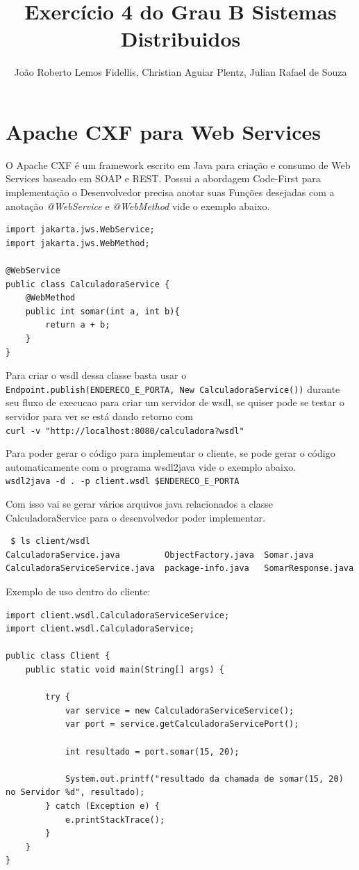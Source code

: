 \documentclass[12pt]{article}
\title{Exercício 4 do Grau B Sistemas Distribuidos}
\author{João Roberto Lemos Fidellis\inst{1}, Christian Aguiar Plentz\inst{2}, 
Julian Rafael de Souza\inst{3}}
\begin{document}
 

\maketitle

\section{Apache CXF para Web Services}

O Apache CXF é um framework escrito em Java para criação e consumo de Web Services baseado em SOAP e REST. Possui a abordagem Code-First para implementação o Desenvolvedor precisa anotar suas Funções desejadas com a anotação \textit{@WebService} e \textit{@WebMethod} vide o exemplo abaixo.

\begin{verbatim}
import jakarta.jws.WebService;
import jakarta.jws.WebMethod;

@WebService
public class CalculadoraService {
	@WebMethod
	public int somar(int a, int b){
		return a + b;
	}
}
\end{verbatim}

Para criar o wsdl dessa classe basta usar o  \\ 
\texttt{Endpoint.publish(ENDERECO\_E\_PORTA, New CalculadoraService())} 
durante seu fluxo de execucao para criar um servidor de wsdl, 
se quiser pode se testar o servidor para ver se está dando retorno com \\
\texttt{curl -v "http://localhost:8080/calculadora?wsdl"}

Para poder gerar o código para implementar o cliente, se pode gerar o código automaticamente
com o programa wsdl2java vide o exemplo abaixo. \\
\texttt{wsdl2java -d . -p client.wsdl \$ENDERECO\_E\_PORTA }

Com isso vai se gerar vários arquivos java relacionados a classe
CalculadoraService para o desenvolvedor poder implementar.

\begin{verbatim}
 $ ls client/wsdl 
CalculadoraService.java         ObjectFactory.java  Somar.java
CalculadoraServiceService.java  package-info.java   SomarResponse.java
\end{verbatim}

Exemplo de uso dentro do cliente:

\begin{verbatim}
import client.wsdl.CalculadoraServiceService;
import client.wsdl.CalculadoraService;

public class Client {
	public static void main(String[] args) {

		try {
			var service = new CalculadoraServiceService();
			var port = service.getCalculadoraServicePort();

			int resultado = port.somar(15, 20);

			System.out.printf("resultado da chamada de somar(15, 20) no Servidor %d", resultado);
		} catch (Exception e) {
			e.printStackTrace();
		}
	}
}

\end{verbatim}
\end{document}
